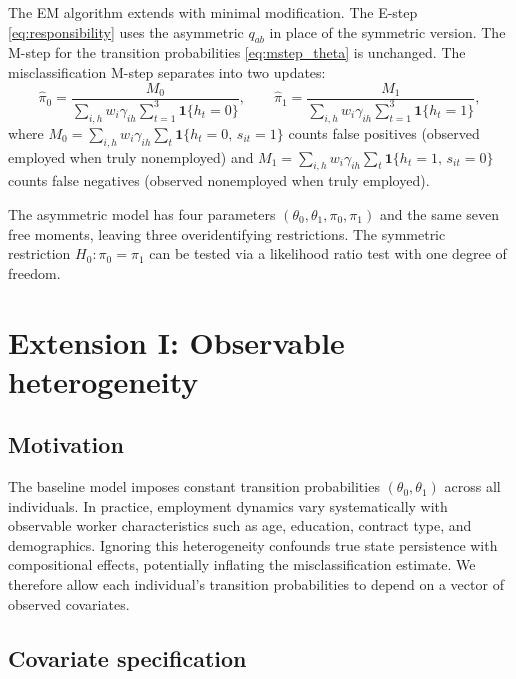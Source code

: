 \documentclass[12pt]{article}
\begin{document}
The EM algorithm extends with minimal modification. The E-step
\eqref{eq:responsibility} uses the asymmetric \(q_{ab}\) in place of
the symmetric version. The M-step for the transition probabilities
\eqref{eq:mstep_theta} is unchanged. The misclassification M-step
separates into two updates:
\begin{equation}
\hat{\pi}_0 = \frac{M_0}{\sum_{i,h} w_i \gamma_{ih}
  \sum_{t=1}^{3} \mathbf{1}\{h_t = 0\}}, \qquad
\hat{\pi}_1 = \frac{M_1}{\sum_{i,h} w_i \gamma_{ih}
  \sum_{t=1}^{3} \mathbf{1}\{h_t = 1\}},
\label{eq:mstep_asymmetric}
\end{equation}
where
\(M_0 = \sum_{i,h} w_i \gamma_{ih}
\sum_{t} \mathbf{1}\{h_t = 0,\, s_{it} = 1\}\)
counts false positives (observed employed when truly nonemployed) and
\(M_1 = \sum_{i,h} w_i \gamma_{ih}
\sum_{t} \mathbf{1}\{h_t = 1,\, s_{it} = 0\}\)
counts false negatives (observed nonemployed when truly employed).

The asymmetric model has four parameters
\((\theta_0, \theta_1, \pi_0, \pi_1)\) and the same seven free moments,
leaving three overidentifying restrictions. The symmetric restriction
\(H_0: \pi_0 = \pi_1\) can be tested via a likelihood ratio test with
one degree of freedom.

\section{Extension I: Observable heterogeneity}
\label{sec:covariates}

\subsection{Motivation}

The baseline model imposes constant transition probabilities
\((\theta_0, \theta_1)\) across all individuals. In practice, employment
dynamics vary systematically with observable worker characteristics such as
age, education, contract type, and demographics. Ignoring this heterogeneity
confounds true state persistence with compositional effects, potentially
inflating the misclassification estimate. We therefore allow each
individual's transition probabilities to depend on a vector of observed
covariates.

\subsection{Covariate specification}
\end{document}
